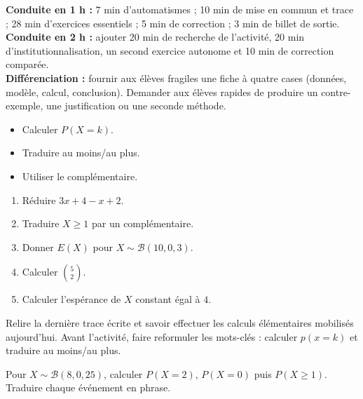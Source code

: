 \ifprof
\begin{methode}
\textbf{Conduite en 1 h :} 7 min d'automatismes ; 10 min de mise en commun et trace ; 28 min d'exercices essentiels ; 5 min de correction ; 3 min de billet de sortie.\\
\textbf{Conduite en 2 h :} ajouter 20 min de recherche de l'activité, 20 min d'institutionnalisation, un second exercice autonome et 10 min de correction comparée.\\
\textbf{Différenciation :} fournir aux élèves fragiles une fiche à quatre cases (données, modèle, calcul, conclusion). Demander aux élèves rapides de produire un contre-exemple, une justification ou une seconde méthode.
\end{methode}
\fi
{}
\begin{objectifs}\begin{itemize}\item Calculer $P(X=k)$.\item Traduire au moins/au plus.\item Utiliser le complémentaire.\end{itemize}\end{objectifs}
\begin{automatismes}\begin{enumerate}\item Réduire $3x+4-x+2$. \item Traduire $X\geq1$ par un complémentaire. \item Donner $E(X)$ pour $X\sim\mathcal B(10,0{,}3)$. \item Calculer $\binom52$. \item Calculer l'espérance de $X$ constant égal à $4$. \end{enumerate}\end{automatismes}
\begin{prerequis}Relire la dernière trace écrite et savoir effectuer les calculs élémentaires mobilisés aujourd'hui. Avant l'activité, faire reformuler les mots-clés : calculer $p(x=k)$ et traduire au moins/au plus.\end{prerequis}

\begin{activite}
Pour $X\sim\mathcal B(8,0{,}25)$, calculer $P(X=2)$, $P(X=0)$ puis $P(X\geq1)$. Traduire chaque événement en phrase.
\begin{center}\end{center}
\end{activite}


